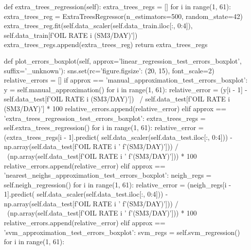 \begin{pythoncode}
    def extra_trees_regression(self):
        extra_trees_regs = []
        for i in range(1, 61):
            extra_trees_reg = ExtraTreesRegressor(n_estimators=500,
                                                  random_state=42)
            extra_trees_reg.fit(self.data_scaler(self.data_train.iloc[:, 0:4]),
                                self.data_train[f'OIL RATE {i} (SM3/DAY)'])
            extra_trees_regs.append(extra_trees_reg)
        return extra_trees_regs

    def plot_errors_boxplot(self, approx='linear_regression_test_errors_boxplot',
                            suffix='_unknown'):
        sns.set(rc={'figure.figsize': (20, 15)}, font_scale=2)
        relative_errors = []
        if approx == 'manual_approximation_test_errors_boxplot':
            y = self.manual_approximation()
            for i in range(1, 61):
                relative_error = (y[i - 1] -
                                  self.data_test[f'OIL RATE {i} (SM3/DAY)']) \
                                 / self.data_test[f'OIL RATE {i} (SM3/DAY)'] * 100
                relative_errors.append(relative_error)
        elif approx == 'extra_trees_regression_test_errors_boxplot':
            extra_trees_regs = self.extra_trees_regression()
            for i in range(1, 61):
                relative_error = (extra_trees_regs[i - 1].predict(
                    self.data_scaler(self.data_test.iloc[:, 0:4])) -
                                  np.array(self.data_test[f'OIL RATE {i} '
                                                          f'(SM3/DAY)'])) / \
                                 (np.array(self.data_test[f'OIL RATE {i} '
                                                          f'(SM3/DAY)'])) * 100
                relative_errors.append(relative_error)
        elif approx == 'nearest_neighs_approximation_test_errors_boxplot':
            neigh_regs = self.neigh_regression()
            for i in range(1, 61):
                relative_error = (neigh_regs[i - 1].predict(
                    self.data_scaler(self.data_test.iloc[:, 0:4])) -
                                  np.array(self.data_test[f'OIL RATE {i} '
                                                          f'(SM3/DAY)'])) / \
                                 (np.array(self.data_test[f'OIL RATE {i} '
                                                          f'(SM3/DAY)'])) * 100
                relative_errors.append(relative_error)
        elif approx == 'svm_approximation_test_errors_boxplot':
            svm_regs = self.svm_regression()
            for i in range(1, 61):

\end{pythoncode}

